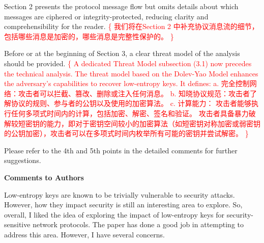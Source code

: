 \documentclass{article}
\newcommand{\response}[1]{\textcolor{red}{\{#1\}}}
\begin{document}
Section 2 presents the protocol message flow but omits details about which messages are ciphered or integrity-protected, reducing clarity and comprehensibility for the reader.
\response{
    我们将在Section 2 中补充协议消息流的细节，包括哪些消息是加密的，哪些消息是完整性保护的。
}

Before or at the beginning of Section 3, a clear threat model of the analysis should be provided.
\response{
    A dedicated Threat Model subsection (3.1) now precedes the technical analysis. 
    The threat model based on the Dolev-Yao Model enhances the adversary's capabilities to recover low-entropy keys.
    It defines:
        a. 完全控制网络：攻击者可以拦截、篡改、删除或注入任何消息。
        b. 知晓协议规范：攻击者了解协议的规则、参与者的公钥以及使用的加密算法。
        c. 计算能力：
            攻击者能够执行任何多项式时间内的计算，包括加密、解密、签名和验证。
            攻击者具备暴力破解较短密钥的能力，即对于密钥空间较小的加密算法（如短密钥对称加密或弱密钥的公钥加密），攻击者可以在多项式时间内枚举所有可能的密钥并尝试解密。
}

Please refer to the 4th and 5th points in the detailed comments for further suggestions.

\rule{0pt}{8pt}

\noindent\textbf{Comments to Authors}

Low-entropy keys are known to be trivially vulnerable to security attacks. 
However, how they impact security is still an interesting area to explore. 
So, overall, I liked the idea of exploring the impact of low-entropy keys for security-sensitive network protocols. 
The paper has done a good job in attempting to address this area. 
However, I have several concerns.
\end{document}
